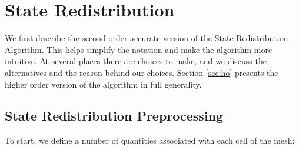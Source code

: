 \section{State Redistribution }\label{sec:srdAlg}

We first describe the second order accurate version of the State
Redistribution Algorithm. 
This helps simplify the notation and make the
algorithm more intuitive.   
At several places there are choices
to make, and we discuss the alternatives and the reason behind our
choices.  
Section \ref{sec:ho} presents the higher order version of the algorithm in full generality.

\subsection{State Redistribution Preprocessing}

To start, we define a number of quantities associated with each cell of the mesh:

